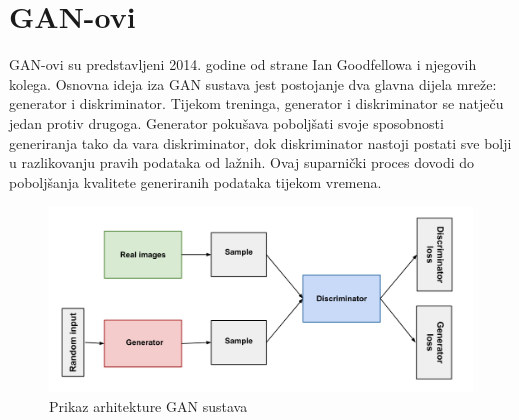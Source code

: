 \documentclass[seminarski, times, utf8]{fer}
\begin{document}
\section{GAN-ovi}
GAN-ovi su predstavljeni 2014. godine od strane Ian Goodfellowa i njegovih kolega.
Osnovna ideja iza GAN sustava jest postojanje dva glavna dijela mreže: generator i diskriminator.
Tijekom treninga, generator i diskriminator se natječu jedan protiv drugoga. Generator pokušava poboljšati svoje sposobnosti generiranja tako da vara diskriminator, dok diskriminator nastoji postati sve bolji u razlikovanju pravih podataka od lažnih. Ovaj suparnički proces dovodi do poboljšanja kvalitete generiranih podataka tijekom vremena.
\begin{figure}[H]
   \centering
   \includegraphics[width=0.7\linewidth]{slike/gan.png}
   \caption{Prikaz arhitekture GAN sustava}
   \label{fig:report}
\end{figure}
\end{document}
